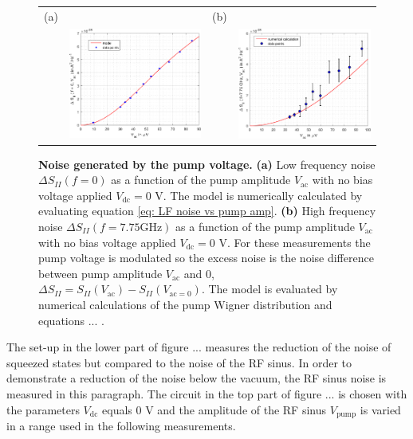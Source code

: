\begin{figure}[hptb]
	\begin{center}
		\begin{tabular}{c c c c}
			(a) & & (b) & \\
			& \includegraphics[width = 6.5 cm]{./chap3/LF_noise_vs_pump_amp} &
			& \includegraphics[width = 6.5 cm]{./chap3/RF_noise_vs_pump_amp}
		\end{tabular}
	\end{center}
	
	\caption{\textbf{Noise generated by the pump voltage.} \textbf{(a)} Low frequency noise $\Delta S_{II}\left(f = 0\right)$ as a function of the pump amplitude $V_{\mathrm{ac}}$ with no bias voltage applied $V_{\mathrm{dc}} = 0$ V. The model is numerically calculated by evaluating equation \eqref{eq: LF noise vs pump amp}. \textbf{(b)} High frequency noise $\Delta S_{II}\left(f = 7.75 \mathrm{GHz} \right)$ as a function of the pump amplitude $V_{\mathrm{ac}}$ with no bias voltage applied $V_{\mathrm{dc}} = 0$ V. For these measurements the pump voltage is modulated so the excess noise is the noise difference between pump amplitude $V_{\mathrm{ac}}$ and 0, $\Delta S_{II} = S_{II}\left(V_{\mathrm{ac}}\right)-S_{II}\left(V_{\mathrm{ac}=0}\right)$. The model is evaluated by numerical calculations of the pump Wigner distribution and equations ... .}
	\label{fig: noise pump vs amp}
\end{figure}

The set-up in the lower part of figure ... measures the reduction of the noise of squeezed states but compared to the noise of the RF sinus.
In order to demonstrate a reduction of the noise below the vacuum, the RF sinus noise is measured in this paragraph.
The circuit in the top part of figure ... is chosen with the parameters $V_{\mathrm{dc}}$ equals 0 V and the amplitude of the RF sinus $V_{\mathrm{pump}}$ is varied in a range used in the following measurements.

